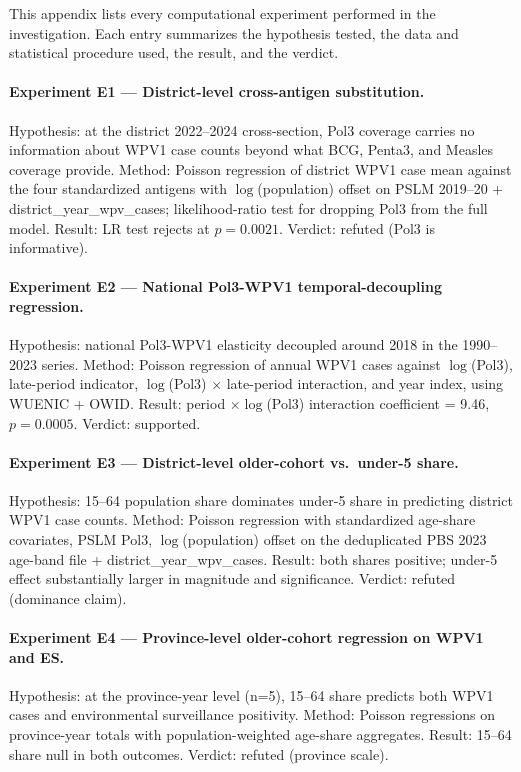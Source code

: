 \documentclass[11pt]{article}
\begin{document}
This appendix lists every computational experiment performed in the investigation. Each entry summarizes the hypothesis tested, the data and statistical procedure used, the result, and the verdict.

\paragraph{Experiment E1 --- District-level cross-antigen substitution.} Hypothesis: at the district 2022--2024 cross-section, Pol3 coverage carries no information about WPV1 case counts beyond what BCG, Penta3, and Measles coverage provide. Method: Poisson regression of district WPV1 case mean against the four standardized antigens with $\log$(population) offset on PSLM 2019--20 + district\_year\_wpv\_cases; likelihood-ratio test for dropping Pol3 from the full model. Result: LR test rejects at $p{=}0.0021$. Verdict: refuted (Pol3 is informative).

\paragraph{Experiment E2 --- National Pol3-WPV1 temporal-decoupling regression.} Hypothesis: national Pol3-WPV1 elasticity decoupled around 2018 in the 1990--2023 series. Method: Poisson regression of annual WPV1 cases against $\log$(Pol3), late-period indicator, $\log$(Pol3) $\times$ late-period interaction, and year index, using WUENIC + OWID. Result: period $\times \log$(Pol3) interaction coefficient = 9.46, $p{=}0.0005$. Verdict: supported.

\paragraph{Experiment E3 --- District-level older-cohort vs.\ under-5 share.} Hypothesis: 15--64 population share dominates under-5 share in predicting district WPV1 case counts. Method: Poisson regression with standardized age-share covariates, PSLM Pol3, $\log$(population) offset on the deduplicated PBS 2023 age-band file + district\_year\_wpv\_cases. Result: both shares positive; under-5 effect substantially larger in magnitude and significance. Verdict: refuted (dominance claim).

\paragraph{Experiment E4 --- Province-level older-cohort regression on WPV1 and ES.} Hypothesis: at the province-year level (n=5), 15--64 share predicts both WPV1 cases and environmental surveillance positivity. Method: Poisson regressions on province-year totals with population-weighted age-share aggregates. Result: 15--64 share null in both outcomes. Verdict: refuted (province scale).
\end{document}
